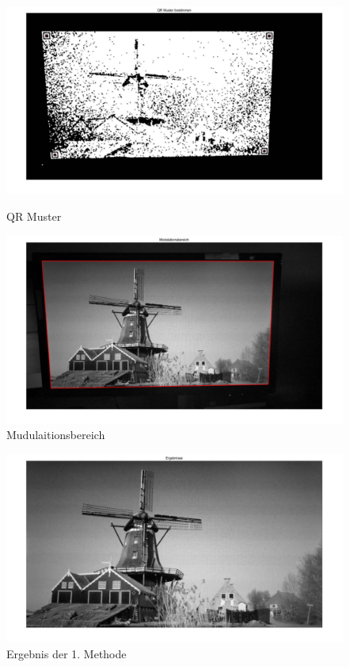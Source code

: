 \begin{figure}[H]
\centering 
\begin{minipage}[b]{0.49\textwidth} 
\centering 
\includegraphics[width=1.0\textwidth]{images/5_Implementirung/QR_muster.pdf} 
\caption{QR Muster}
\label{fig:QR_muster}
\end{minipage}
\begin{minipage}[b]{0.49\textwidth} 
\centering 
\includegraphics[width=1.0\textwidth]{images/5_Implementirung/Mudulaition.pdf}
\caption{Mudulaitionsbereich}
\label{fig:Mudulaitionbereich}
\end{minipage}
\end{figure}

\begin{figure}[H]
 \centering 
  \includegraphics[keepaspectratio,width=1.0\textwidth]{images/5_Implementirung/ergeb.pdf}
 \caption{Ergebnis der 1. Methode}
 \label{fig:Ergebnis1}
\end{figure}

